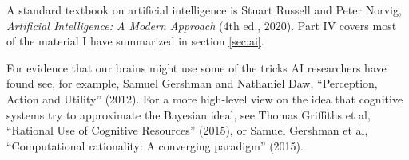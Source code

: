 \begin{sources}

  A standard textbook on artificial intelligence is Stuart Russell and Peter
  Norvig, \emph{Artificial Intelligence: A Modern Approach} (4th ed., 2020).
  Part IV covers most of the material I have summarized in section \ref{sec:ai}.


  
  For evidence that our brains might use some of the tricks AI researchers have
  found see, for example, Samuel Gershman and Nathaniel Daw, ``Perception,
  Action and Utility'' (2012). For a more high-level view on the idea that
  cognitive systems try to approximate the Bayesian ideal, see Thomas Griffiths
  et al, ``Rational Use of Cognitive Resources'' (2015), or Samuel Gershman et
  al, ``Computational rationality: A converging paradigm'' (2015).




  

\end{sources}
